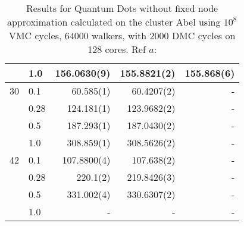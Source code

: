 \begin{table}
\begin{center}
\begin{tabular}{rl|rrr}
          &   1.0    & 156.0630(9) & 155.8821(2) & 155.868(6) \\
\hline
    30    &   0.1    & 60.585(1)   & 60.4207(2)  & - \\
          &   0.28   & 124.181(1)  & 123.9682(2) & -\\
          &   0.5    & 187.293(1)  & 187.0430(2) & - \\
          &   1.0    & 308.859(1)  & 308.5626(2) & -\\
\hline
    42    &   0.1    &  107.8800(4)  & 107.638(2)   & -\\
          &   0.28   &  220.1(2)     & 219.8426(3)  & - \\
          &   0.5    & 331.002(4)    & 330.6307(2)  & - \\
          &   1.0    & -             &  -           & - \\

\end{tabular}
\caption{Results for Quantum Dots without fixed node approximation calculated on the cluster Abel using $10^8$ VMC cycles, $64000$ walkers, with $2000$ DMC cycles on 128 cores. Ref $a$: \cite{MagnusArticle}}
\end{center}
\end{table}